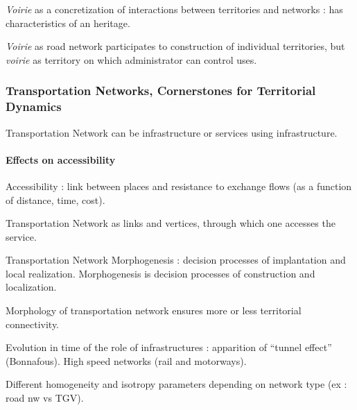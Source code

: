 \textit{Voirie} as a concretization of interactions between territories and networks : has characteristics of an heritage.

\textit{Voirie} as road network participates to construction of individual territories, but \textit{voirie} as territory on which administrator can control uses.


\subsubsection*{Transportation Networks, Cornerstones for Territorial Dynamics}

Transportation Network can be infrastructure or services using infrastructure.

\paragraph{Effects on accessibility}

Accessibility : link between places and resistance to exchange flows (as a function of distance, time, cost).

Transportation Network as links and vertices, through which one accesses the service.

Transportation Network Morphogenesis : decision processes of implantation and local realization. Morphogenesis is decision processes of construction and localization.

Morphology of transportation network ensures more or less territorial connectivity.

Evolution in time of the role of infrastructures : apparition of ``tunnel effect'' (Bonnafous). High speed networks (rail and motorways).

Different homogeneity and isotropy parameters depending on network type (ex : road nw vs TGV). 











